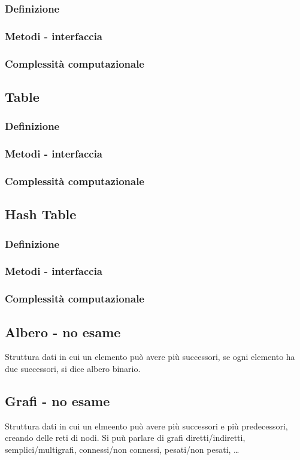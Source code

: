 \documentclass[a4paper]{article}
\begin{document}
\subsubsection*{Definizione}
\subsubsection*{Metodi - interfaccia}
\subsubsection*{Complessità computazionale}

\subsection{Table}
\subsubsection*{Definizione}
\subsubsection*{Metodi - interfaccia}
\subsubsection*{Complessità computazionale}

\subsection{Hash Table}
\subsubsection*{Definizione}
\subsubsection*{Metodi - interfaccia}
\subsubsection*{Complessità computazionale}

\newpage

\subsection{Albero - no esame}
Struttura dati in cui un elemento può avere più successori, se ogni elemento ha due successori, si dice albero binario.

\subsection{Grafi - no esame}
Struttura dati in cui un elmeento può avere più successori e più predecessori, creando delle reti di nodi.
Si puù parlare di grafi diretti/indiretti, semplici/multigrafi, connessi/non connessi, pesati/non pesati, \dots
\end{document}
